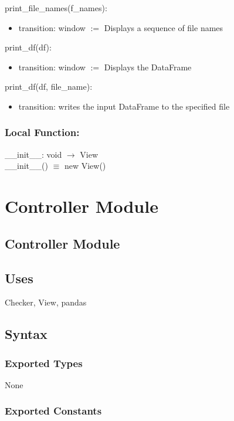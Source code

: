 \documentclass[12pt]{article}
\begin{document}
\noindent print\_file\_names(f\_names):
\begin{itemize}
\item transition: window $:=$ Displays a sequence of file names
\end{itemize}

\noindent print\_df(df):
\begin{itemize}
\item transition: window $:=$ Displays the DataFrame
\end{itemize}

\noindent print\_df(df, file\_name):
\begin{itemize}
\item transition: writes the input DataFrame to the specified file
\end{itemize}

\subsubsection*{Local Function:}

\_\_init\_\_: void $\rightarrow$ View \\
\_\_init\_\_() $\equiv$ new View()

\newpage

\section* {Controller Module}

\subsection* {Controller Module}

\subsection* {Uses}

Checker, View, pandas

\subsection* {Syntax}

\subsubsection* {Exported Types}

None

\subsubsection* {Exported Constants}
\end{document}
